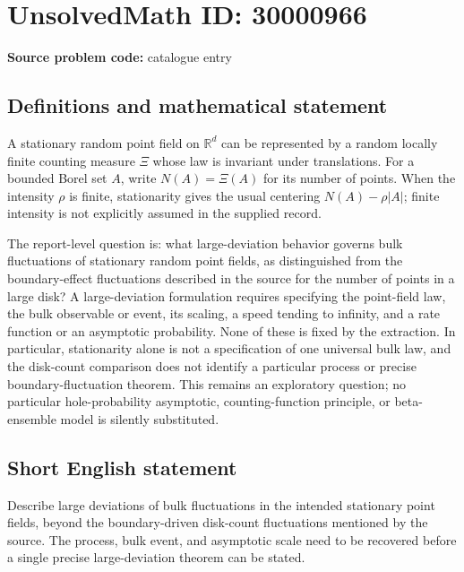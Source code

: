 \documentclass[11pt]{article}
\newcommand{\R}{\mathbb{R}}
\begin{document}
\section*{UnsolvedMath ID: 30000966}
\textbf{Source problem code:} catalogue entry
\subsection{Definitions and mathematical statement}
A stationary random point field on \(\R^d\) can be represented by a random locally finite counting measure \(\Xi\) whose law is invariant under translations. For a bounded Borel set \(A\), write \(N(A)=\Xi(A)\) for its number of points. When the intensity \(\rho\) is finite, stationarity gives the usual centering \(N(A)-\rho|A|\); finite intensity is not explicitly assumed in the supplied record.

The report-level question is: what large-deviation behavior governs bulk fluctuations of stationary random point fields, as distinguished from the boundary-effect fluctuations described in the source for the number of points in a large disk? A large-deviation formulation requires specifying the point-field law, the bulk observable or event, its scaling, a speed tending to infinity, and a rate function or an asymptotic probability. None of these is fixed by the extraction. In particular, stationarity alone is not a specification of one universal bulk law, and the disk-count comparison does not identify a particular process or precise boundary-fluctuation theorem. This remains an exploratory question; no particular hole-probability asymptotic, counting-function principle, or beta-ensemble model is silently substituted.
\subsection{Short English statement}
Describe large deviations of bulk fluctuations in the intended stationary point fields, beyond the boundary-driven disk-count fluctuations mentioned by the source. The process, bulk event, and asymptotic scale need to be recovered before a single precise large-deviation theorem can be stated.
\end{document}
